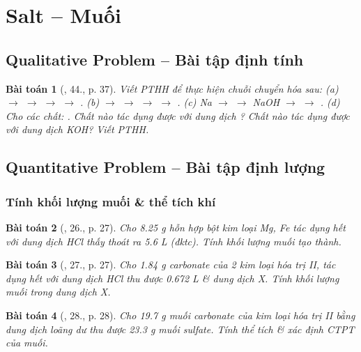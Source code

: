 \documentclass{article}
\newtheorem{baitoan}{Bài toán}
\begin{document}

\section{Salt -- Muối}

\subsection{Qualitative Problem -- Bài tập định tính}

\begin{baitoan}[\cite{An_350_BT_Hoa_Hoc_9}, 44., p. 37]
	Viết PTHH để thực hiện chuỗi chuyển hóa sau: (a) \emph{ $\to$  $\to$  $\to$  $\to$ }. (b) \emph{ $\to$  $\to$  $\to$  $\to$ }. (c) \emph{Na $\to$  $\to$ NaOH $\to$  $\to$ }. (d) Cho các chất: \emph{}. Chất nào tác dụng được với dung dịch \emph{}? Chất nào tác dụng được với dung dịch \emph{KOH}? Viết PTHH.
\end{baitoan}

\subsection{Quantitative Problem -- Bài tập định lượng}

\subsubsection{Tính khối lượng muối \& thể tích khí }

\begin{baitoan}[\cite{An_350_BT_Hoa_Hoc_9}, 26., p. 27]
	Cho \emph{8.25 g} hỗn hợp bột kim loại \emph{Mg, Fe} tác dụng hết với dung dịch \emph{HCl} thấy thoát ra \emph{5.6 L } (đktc). Tính khối lượng muối tạo thành.
\end{baitoan}

\begin{baitoan}[\cite{An_350_BT_Hoa_Hoc_9}, 27., p. 27]
	Cho \emph{1.84 g} carbonate của 2 kim loại hóa trị II, tác dụng hết với dung dịch \emph{HCl} thu được \emph{0.672 L } \& dung dịch X. Tính khối lượng muối trong dung dịch X.
\end{baitoan}

\begin{baitoan}[\cite{An_350_BT_Hoa_Hoc_9}, 28., p. 28]
	Cho \emph{19.7 g} muối carbonate của kim loại hóa trị II bằng dung dịch \emph{} loãng dư thu được \emph{23.3 g} muối sulfate. Tính thể tích \emph{} \& xác định CTPT của muối.
\end{baitoan}
\end{document}
